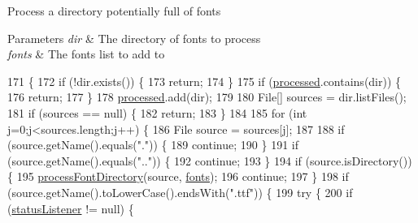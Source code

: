 Process a directory potentially full of fonts


\begin{DoxyParams}{Parameters}
{\em dir} & The directory of fonts to process \\
\hline
{\em fonts} & The fonts list to add to \\
\hline
\end{DoxyParams}

\begin{DoxyCode}
171                                                                         \{
172         \textcolor{keywordflow}{if} (!dir.exists()) \{
173             \textcolor{keywordflow}{return};
174         \}
175         \textcolor{keywordflow}{if} (\mbox{\hyperlink{classorg_1_1newdawn_1_1slick_1_1tools_1_1hiero_1_1truetype_1_1_font_data_ac41bafa7d1178a87a42d524448f191a9}{processed}}.contains(dir)) \{
176             \textcolor{keywordflow}{return};
177         \}
178         \mbox{\hyperlink{classorg_1_1newdawn_1_1slick_1_1tools_1_1hiero_1_1truetype_1_1_font_data_ac41bafa7d1178a87a42d524448f191a9}{processed}}.add(dir);
179         
180         File[] sources = dir.listFiles();
181         \textcolor{keywordflow}{if} (sources == null) \{
182             \textcolor{keywordflow}{return};
183         \}
184         
185         \textcolor{keywordflow}{for} (\textcolor{keywordtype}{int} j=0;j<sources.length;j++) \{
186             File source = sources[j];
187         
188             \textcolor{keywordflow}{if} (source.getName().equals(\textcolor{stringliteral}{"."})) \{
189                 \textcolor{keywordflow}{continue};
190             \}
191             \textcolor{keywordflow}{if} (source.getName().equals(\textcolor{stringliteral}{".."})) \{
192                 \textcolor{keywordflow}{continue};
193             \}
194             \textcolor{keywordflow}{if} (source.isDirectory()) \{
195                 \mbox{\hyperlink{classorg_1_1newdawn_1_1slick_1_1tools_1_1hiero_1_1truetype_1_1_font_data_a8c35c1c3236ac00f0639ae1947656d28}{processFontDirectory}}(source, \mbox{\hyperlink{classorg_1_1newdawn_1_1slick_1_1tools_1_1hiero_1_1truetype_1_1_font_data_af5a135e5f654e01a6d82aa58a37d8b24}{fonts}});
196                 \textcolor{keywordflow}{continue};
197             \}
198             \textcolor{keywordflow}{if} (source.getName().toLowerCase().endsWith(\textcolor{stringliteral}{".ttf"})) \{
199                 \textcolor{keywordflow}{try} \{
200                     \textcolor{keywordflow}{if} (\mbox{\hyperlink{classorg_1_1newdawn_1_1slick_1_1tools_1_1hiero_1_1truetype_1_1_font_data_aa1e117e156dc915030130f6e37336246}{statusListener}} != null) \{

\end{DoxyCode}
